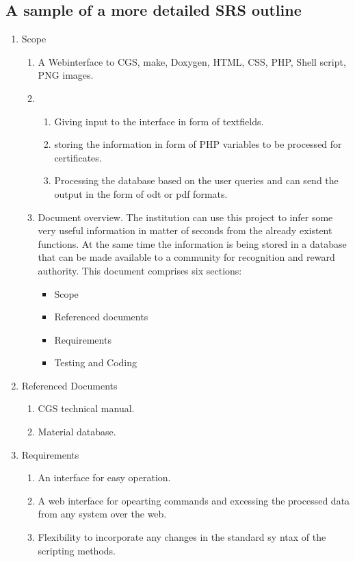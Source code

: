 \subsection*{A sample of a more detailed SRS outline}
\begin{enumerate}
\item Scope  
	\begin{enumerate}
	\item A Webinterface to CGS,
		make, Doxygen, HTML, CSS, PHP,
		Shell script, PNG
		images.
		\item
		\begin{enumerate}
		\item  Giving input to the interface in form of textfields. \\
		\item  storing the information in form of PHP variables to be processed for certificates. \\
		\item Processing the database
		based on the user queries and
		can send the output in the form of odt or pdf formats.
		 		\end{enumerate}
		\item  Document overview.
		The institution can use this
		project to infer some very
		 useful
		information in matter of seconds
		from the already
		 existent functions. At the same
		time the information is being
		stored in a database that can be
		made available to a community for recognition and reward authority.
		This document comprises six
		sections:
		\begin{itemize}
		\item Scope
		\item Referenced documents
		\item Requirements
		\item Testing and Coding 
				\end{itemize}
\end{enumerate}


\item Referenced Documents 
\begin{enumerate}
\item CGS technical
manual.
\item Material database.
\end{enumerate} 
\item Requirements 
\begin{enumerate}
\item An interface for easy operation.
\item A web interface for opearting commands and excessing the processed
data from any
 system over the
web.
\item Flexibility
 to incorporate any
changes in the standard sy
ntax of
the scripting
methods. 

\end{enumerate}
\end{enumerate}


